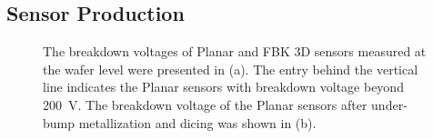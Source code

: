 

\subsection{Sensor Production}
\label{sec:sensor_qa}
\begin{figure}
\centering
{}
\caption{The breakdown voltages of Planar  and FBK 3D sensors measured at the wafer level were presented in (a). The entry behind the vertical line indicates the Planar  sensors with breakdown voltage beyond \SI{200}{\volt}. The breakdown voltage of the Planar  sensors after under-bump metallization and dicing was shown in (b).}
\label{fig:sensor_breakdown}
\end{figure}

